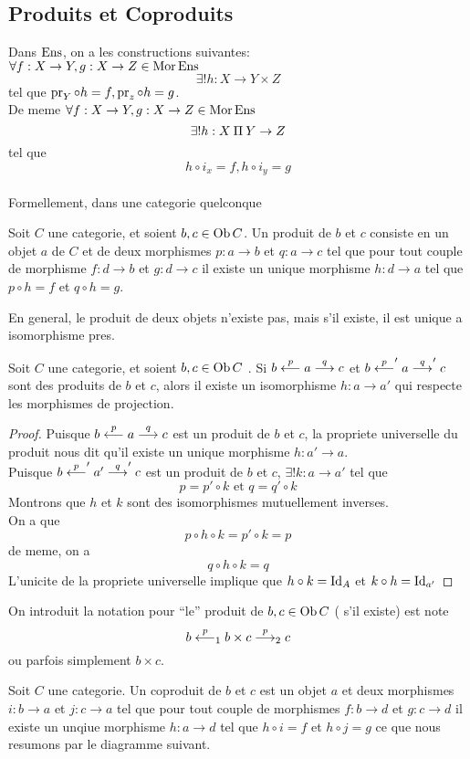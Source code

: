 \documentclass[../main.tex]{subfiles}
\begin{document}
\subsection{Produits et Coproduits}
Dans $\operatorname{Ens}$, on a les constructions suivantes:\\
$\forall f: X \to Y, g: X \to Z\in \operatorname{Mor} \operatorname{Ens}$ 
\[ 
\exists ! h : X \to Y\times Z
\]
tel que $\operatorname{pr}_Y\circ h =f, \operatorname{pr}_z\circ h =g$.\\
De meme
$\forall f: X \to Y, g: X \to Z\in \operatorname{Mor} \operatorname{Ens}$ 
\[ 
\exists! h: X\mathbin{\Pi} Y \to Z 
\]
tel que
\[ 
h\circ i_x = f, h \circ i_y = g
\]
\hr\\
Formellement, dans une categorie quelconque
\begin{defn}
Soit $C$ une categorie, et soient $b,c \in \operatorname{Ob} C$. Un produit de $b$ et $c$ consiste en un objet $a$ de $C$ et de deux morphismes $p: a\to b$ et $q: a\to c$ tel que pour tout couple de morphisme $f: d\to b$ et $g: d\to c$ il existe un unique morphisme $h: d\to a$ tel que $p\circ h = f$ et $q\circ h =g$.	
\end{defn}
\begin{rmq}
En general, le produit de deux objets n'existe pas, mais s'il existe, il est unique a isomorphisme pres.
\end{rmq}
\begin{lemma}
Soit $C$ une categorie, et soient $b,c \in \operatorname{Ob} C$ . Si $ b \overset{ p}{\longleftarrow} a \overset{q}{\longrightarrow} c$ et $b \overset{p}{\longleftarrow}' a \overset{q}{\longrightarrow}' c$ sont des produits de $b$ et $c$, alors il existe un isomorphisme $h: a\to a'$ qui respecte les morphismes de projection.
\end{lemma}
\begin{proof}
Puisque $b \overset{p}{\longleftarrow} a \overset{q}{\longrightarrow} c$ est un produit de $b$ et $c$, la propriete universelle du produit nous dit qu'il existe un unique morphisme $h : a' \to a $.\\
Puisque $b \overset{p}{\longleftarrow}' a' \overset{q}{\longrightarrow}' c$ est un produit de $b$ et $c$, $\exists ! k : a\to a'$ tel que
\[ 
p = p' \circ k \text{ et } q= q'\circ k
\]
Montrons que $h$ et $k$ sont des isomorphismes mutuellement inverses.\\
On a que
\[ 
p \circ h \circ k = p' \circ k = p
\]
de meme, on a
\[ 
q\circ h \circ k = q
\]
L'unicite de la propriete universelle implique que $h\circ k = \operatorname{Id}_A$ et $k\circ h = \operatorname{Id}_{a'} $
\end{proof}
On introduit la notation pour ``le'' produit de $b,c \in \operatorname{Ob} C$ ( s'il existe) est note
\[ 
b \overset{p}{\longleftarrow}_1 b\times c \overset{p}{\longrightarrow}_2 c
\]
ou parfois simplement $b \times c$.
\begin{defn}[Coproduit]
	Soit $C$ une categorie. Un coproduit de $b$ et $c$ est un objet $a$ et deux morphismes $i: b \to a$ et $j: c\to a$ tel que pour tout couple de morphismes $f: b \to d$ et $g:c \to d$ il existe un unqiue morphisme $h: a \to d$ tel que $h \circ i = f$ et $h \circ j = g$ ce que nous resumons par le diagramme suivant.
\end{defn}
\end{document}
